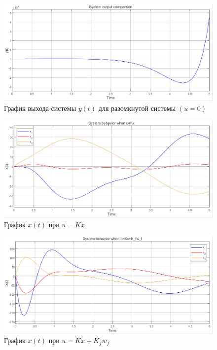 \documentclass[a4paper, 12pt]{article}
\begin{document}
    \begin{figure}[H]
        \centering
        \includegraphics[scale=0.6]{1task_y.png}
        \captionsetup{skip=0pt}
        \caption{График выхода системы $y(t)$ для разомкнутой системы $\left( u=0 \right)$}
        \label{fig:1task_y}
    \end{figure}
    \begin{figure}[H]
        \centering
        \includegraphics[scale=0.6]{1task_x_kx.png}
        \captionsetup{skip=0pt}
        \caption{График $x(t)$ при $u=Kx$}
        \label{fig:1task_x_kx}
    \end{figure}
    \begin{figure}[H]
        \centering
        \includegraphics[scale=0.6]{1task_x_kxkf.png}
        \captionsetup{skip=0pt}
        \caption{График $x(t)$ при $u=Kx+K_fw_f$}
        \label{fig:1task_x_kxkf}
    \end{figure}
\end{document}
